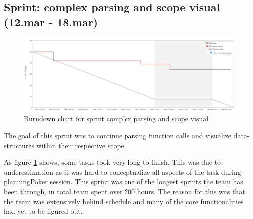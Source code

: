 \subsection{Sprint: complex parsing and scope visual (12.mar - 18.mar)}
\begin{figure}[H] 
    \includegraphics[width=\textwidth]{inc/images/sprints/sprintComplexParsingAndScopeVisual120319-180319.png}
    \caption{Burndown chart for sprint complex parsing and scope visual}
    \label{fig:sprintComplexParsingAndScopeVisual}
\end{figure}

The goal of this \gls{sprint} was to continue parsing function calls and visualize data-structures within their respective scope.

As figure \ref{fig:sprintComplexParsingAndScopeVisual} shows, some tasks took very long to finish. This was due to underestimation as it was hard to conceptualize all aspects of the task during \Gls{planningPoker} session. This \gls{sprint} was one of the longest \glspl{sprint} the team has been through, in total team spent over 200 hours. The reason for this was that the team was extensively behind schedule and many of the core functionalities had yet to be figured out.

